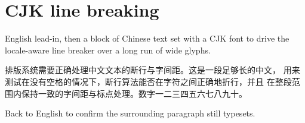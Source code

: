 \documentclass[12pt]{article}
\begin{document}
\section*{CJK line breaking}

English lead-in, then a block of Chinese text set with a CJK font to
drive the locale-aware line breaker over a long run of wide glyphs.

{\cjkfont
排版系统需要正确处理中文文本的断行与字间距。这是一段足够长的中文，
用来测试在没有空格的情况下，断行算法能否在字符之间正确地折行，并且
在整段范围内保持一致的字间距与标点处理。数字一二三四五六七八九十。
}

Back to English to confirm the surrounding paragraph still typesets.
\end{document}
